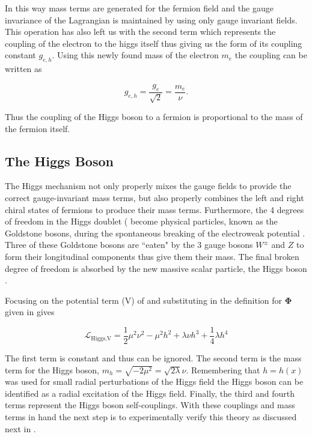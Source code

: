 In this way mass terms are generated for the fermion field and the gauge
invariance of the Lagrangian is maintained by using only gauge invariant
fields.  This operation has also left us with the second term which represents
the coupling of the electron to the higgs itself thus giving us the form of its
coupling constant $g_{e,h}$.  Using this newly found mass of the electron
$m_{e}$ the coupling can be written as

\begin{equation}
g_{e,h} = \frac{g_{e}}{\sqrt{2}} = \frac{m_{e}}{\nu}.
\end{equation}

Thus the coupling of the Higgs boson to a fermion is proportional
to the mass of the fermion itself. 
 
\subsection{The Higgs Boson}

The Higgs mechanism not only properly mixes the gauge fields to provide the
correct gauge-invariant mass terms, but also properly combines the left and
right chiral states of fermions to produce their mass terms. Furthermore, the 4
degrees of freedom in the Higgs doublet ( become
physical particles, known as the Goldstone bosons, during the spontaneous
breaking of the electroweak potential \cite{Higgs:1964pj}.  Three of these
Goldstone bosons are ``eaten" by the 3 gauge bosons $W^{\pm}$ and $Z$ to form
their longitudinal components thus give them their mass. The final broken
degree of freedom is absorbed by the new massive scalar particle, the Higgs
boson \cite{Higgs:1964pj}.

Focusing on the potential term (V) of
 and substituting in the definition for
$\boldsymbol{\Phi}$ given in  gives

\begin{equation}
\mathcal{L}_\text{Higgs,V} = \frac{1}{2} \mu^{2} \nu^{2} - \mu^{2} h^{2} +
\lambda \nu h^{3} + \frac{1}{4} \lambda h^{4}
\end{equation}

The first term is constant and thus can be ignored.  The second term is the
mass term for the Higgs boson, $m_h = \sqrt{-2\mu^{2}} = \sqrt{2\lambda}\nu$.
Remembering that $h = h(x)$ was used for small radial perturbations of the
Higgs field the Higgs boson can be identified as a radial excitation of the
Higgs field.  Finally, the third and fourth terms represent the Higgs boson
self-couplings.  With these couplings and mass terms in hand the next step is
to experimentally verify this theory as discussed next in .
